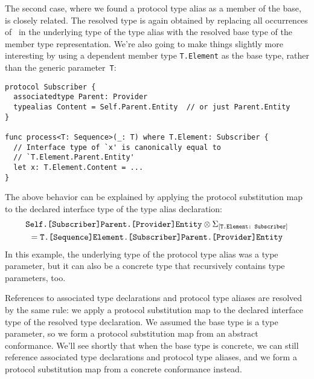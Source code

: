 \documentclass[../generics]{subfiles}
\begin{document}
The second case, where we found a protocol type alias as a member of the base, is closely related. The resolved type is again obtained by replacing all occurrences of \tSelf\ in the underlying type of the type alias with the resolved base type of the member type representation. We're also going to make things slightly more interesting by using a dependent member type \texttt{T.Element} as the base type, rather than the generic parameter~\texttt{T}:
\begin{Verbatim}
protocol Subscriber {
  associatedtype Parent: Provider
  typealias Content = Self.Parent.Entity  // or just Parent.Entity
}

func process<T: Sequence>(_: T) where T.Element: Subscriber {
  // Interface type of `x' is canonically equal to
  // `T.Element.Parent.Entity'
  let x: T.Element.Content = ...
}
\end{Verbatim}
The above behavior can be explained by applying the protocol substitution map to the declared interface type of the type alias declaration:
\begin{multline*}
\texttt{Self.[Subscriber]Parent.[Provider]Entity}\otimes\Sigma_{[\texttt{T.Element:~Subscriber}]}\\
=\texttt{T.[Sequence]Element.[Subscriber]Parent.[Provider]Entity}
\end{multline*}
In this example, the underlying type of the protocol type alias was a type parameter, but it can also be a concrete type that recursively contains type parameters, too.

\smallskip

References to associated type declarations and protocol type aliases are resolved by the same rule: we apply a protocol substitution map to the declared interface type of the resolved type declaration. We assumed the base type is a type parameter, so we form a protocol substitution map from an abstract conformance. We'll see shortly that when the base type is concrete, we can still reference associated type declarations and protocol type aliases, and we form a protocol substitution map from a concrete conformance instead.
\end{document}
